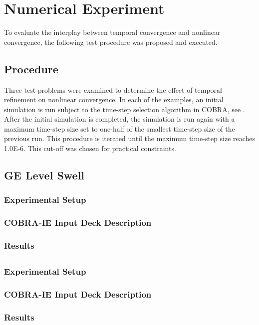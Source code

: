 \chapter{Numerical Experiment}
\label{chap:numerical_experiments}
To evaluate the interplay between temporal convergence and nonlinear convergence, the following test procedure was proposed and executed.

\section{Procedure}
Three test problems were examined to determine the effect of temporal refinement on nonlinear convergence.
In each of the examples, an initial simulation is run subject to the time-step selection algorithm in COBRA, see .
After the initial simulation is completed, the simulation is run again with a maximum time-step size set to one-half of the smallest time-step size of the previous run.
This procedure is iterated until the maximum time-step size reaches 1.0E-6.
This cut-off was chosen for practical constraints.

\section{GE Level Swell}
\subsection{Experimental Setup}
\subsection{COBRA-IE Input Deck Description}
\subsection{Results}

\section{}
\subsection{Experimental Setup}
\subsection{COBRA-IE Input Deck Description}
\subsection{Results}

